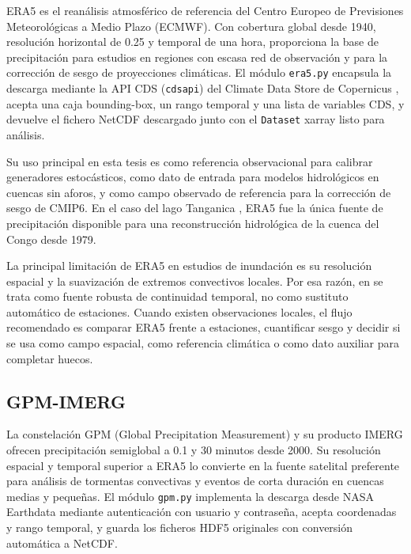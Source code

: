 ERA5 \parencite{hersbach2020era5} es el reanálisis atmosférico de referencia del Centro Europeo de Previsiones Meteorológicas a Medio Plazo (ECMWF). Con cobertura global desde 1940, resolución horizontal de 0.25\textdegree{} y temporal de una hora, proporciona la base de precipitación para estudios en regiones con escasa red de observación y para la corrección de sesgo de proyecciones climáticas. El módulo \texttt{era5.py} encapsula la descarga mediante la API CDS (\texttt{cdsapi}) del Climate Data Store de Copernicus \parencite{copernicuscds}, acepta una caja bounding-box, un rango temporal y una lista de variables CDS, y devuelve el fichero NetCDF descargado junto con el \texttt{Dataset} xarray listo para análisis.

Su uso principal en esta tesis es como referencia observacional para calibrar generadores estocásticos, como dato de entrada para modelos hidrológicos en cuencas sin aforos, y como campo observado de referencia para la corrección de sesgo de CMIP6. En el caso del lago Tanganica \parencite{navas2025tanganicaIA}, ERA5 fue la única fuente de precipitación disponible para una reconstrucción hidrológica de la cuenca del Congo desde 1979.

La principal limitación de ERA5 en estudios de inundación es su resolución espacial y la suavización de extremos convectivos locales. Por esa razón, en \pyhydra se trata como fuente robusta de continuidad temporal, no como sustituto automático de estaciones. Cuando existen observaciones locales, el flujo recomendado es comparar ERA5 frente a estaciones, cuantificar sesgo y decidir si se usa como campo espacial, como referencia climática o como dato auxiliar para completar huecos.

\subsection{GPM-IMERG}

La constelación GPM (Global Precipitation Measurement) y su producto IMERG \parencite{huffman2020gpm} ofrecen precipitación semiglobal a 0.1\textdegree{} y 30 minutos desde 2000. Su resolución espacial y temporal superior a ERA5 lo convierte en la fuente satelital preferente para análisis de tormentas convectivas y eventos de corta duración en cuencas medias y pequeñas. El módulo \texttt{gpm.py} implementa la descarga desde NASA Earthdata \parencite{nasaearthdata} mediante autenticación con usuario y contraseña, acepta coordenadas y rango temporal, y guarda los ficheros HDF5 originales con conversión automática a NetCDF.

